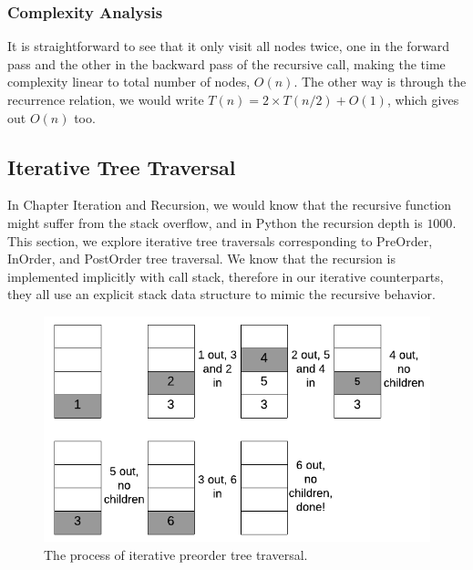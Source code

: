 \documentclass[main.tex]{subfiles}
\begin{document}
\subsubsection{Complexity Analysis}
It is straightforward to see that it only visit all nodes twice, one in the forward pass and the other in the backward pass of the recursive call, making the time complexity linear to total number of nodes, $O(n)$. The other way is through the recurrence relation, we would write $T(n)=2\times T(n/2)+O(1)$, which gives out $O(n)$ too. 
    
\subsection{Iterative Tree Traversal}
In Chapter Iteration and Recursion, we would know that the recursive function might suffer from the stack overflow, and in Python the recursion depth is $1000$. This section, we explore iterative tree traversals corresponding to PreOrder, InOrder, and PostOrder tree traversal. We know that the recursion is implemented implicitly with call stack, therefore in our iterative counterparts, they all use an explicit stack data structure to mimic the recursive behavior. 
\begin{figure}[!ht]
    \centering
    \includegraphics[width = .9\columnwidth]{fig/iterative_tree_traversal_preorder.png}
    \caption{The process of iterative preorder tree traversal.}
    \label{fig:iterative_tree_traveral_preorder}
\end{figure}
\end{document}
